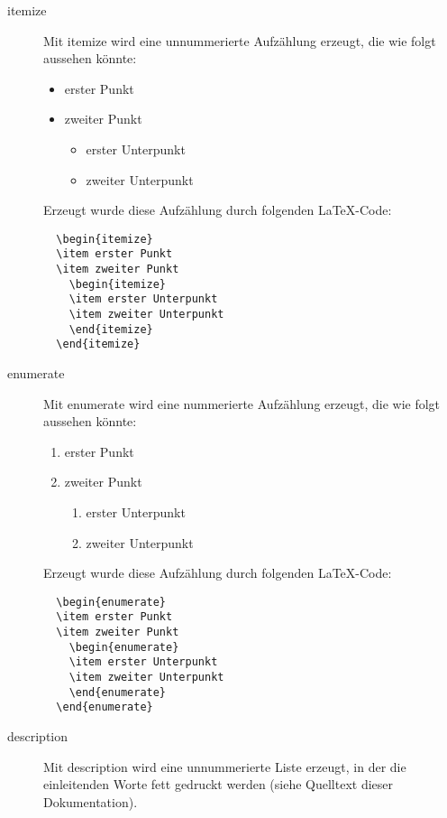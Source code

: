 \begin{description}
\item [itemize] Mit itemize wird eine unnummerierte Aufzählung erzeugt,
  die wie folgt aussehen könnte:
  \begin{itemize}
  \item erster Punkt
  \item zweiter Punkt
    \begin{itemize}
    \item erster Unterpunkt
    \item zweiter Unterpunkt
    \end{itemize}
  \end{itemize}

Erzeugt wurde diese Aufzählung durch folgenden \LaTeX-Code:
\begin{verbatim}
  \begin{itemize}
  \item erster Punkt
  \item zweiter Punkt
    \begin{itemize}
    \item erster Unterpunkt
    \item zweiter Unterpunkt
    \end{itemize}
  \end{itemize}
\end{verbatim}

\item [enumerate] Mit enumerate wird eine nummerierte Aufzählung erzeugt,
  die wie folgt aussehen könnte:
  \begin{enumerate}
  \item erster Punkt
  \item zweiter Punkt
    \begin{enumerate}
    \item erster Unterpunkt
    \item zweiter Unterpunkt
    \end{enumerate}
  \end{enumerate}

Erzeugt wurde diese Aufzählung durch folgenden \LaTeX-Code:
\begin{verbatim}
  \begin{enumerate}
  \item erster Punkt
  \item zweiter Punkt
    \begin{enumerate}
    \item erster Unterpunkt
    \item zweiter Unterpunkt
    \end{enumerate}
  \end{enumerate}
\end{verbatim}

\item[description] Mit description wird eine unnummerierte Liste
  erzeugt, in der die einleitenden Worte fett gedruckt werden (siehe
  Quelltext dieser Dokumentation).
\end{description}


